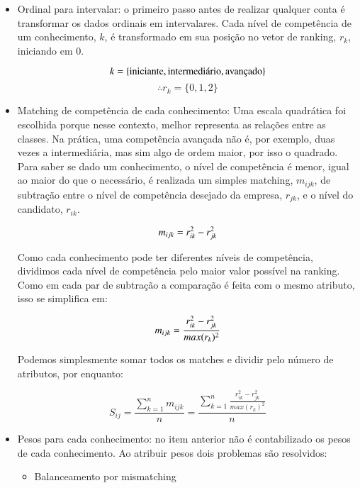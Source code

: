 \documentclass[preprint,12pt]{elsarticle}
\begin{document}
\begin{itemize}
    \item Ordinal para intervalar: o primeiro passo antes de realizar qualquer conta é transformar os dados ordinais em intervalares. Cada nível de competência de um conhecimento, $k$, é transformado em sua posição no vetor de ranking, $r_k$, iniciando em 0.
    
    $$\\k = \{ \text{iniciante}, \text{intermediário}, \text{avançado} \}$$ 
    $$ \therefore r_k = \{ 0, 1, 2 \} $$
    
    \item Matching de competência de cada conhecimento: Uma escala quadrática foi escolhida porque nesse contexto, melhor representa as relações entre as classes. Na prática, uma competência avançada não é, por exemplo, duas vezes a intermediária, mas sim algo de ordem maior, por isso o quadrado. Para saber se dado um conhecimento, o nível de competência é menor, igual ao maior do que o necessário, é realizada um simples matching, $m_{ijk}$, de subtração entre o nível de competência desejado da empresa, $r_{jk}$, e o nível do candidato, $r_{ik}$.
    
    $$\\ m_{ijk} = r_{ik}^2 - r_{jk}^2 $$
    
    Como cada conhecimento pode ter diferentes níveis de competência, dividimos cada nível de competência pelo maior valor possível na ranking. Como em cada par de subtração a comparação é feita com o mesmo atributo, isso se simplifica em:
    
    $$\\ m_{ijk} = \frac{r_{ik}^2 - r_{jk}^2}{max(r_k)^2} $$
    
    Podemos simplesmente somar todos os matches e dividir pelo número de atributos, por enquanto:
      
    \begin{equation}
    S_{ij} =  \frac{\sum_{k=1}^n m_{ijk}}
                  {n} = 
              \frac{\sum_{k=1}^n \frac{r_{ik}^2 - r_{jk}^2}{max(r_k)^2}}
                  {n}
    \end{equation}
    
    \item Pesos para cada conhecimento: no item anterior não é contabilizado os pesos de cada conhecimento. Ao atribuir pesos dois problemas são resolvidos:
    
    \begin{itemize}
       \item Balanceamento por mismatching
       

\end{itemize}
\end{itemize}
\end{document}
